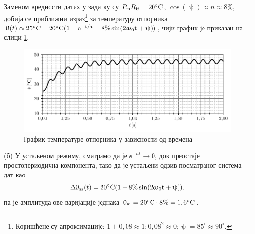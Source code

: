 Заменом вредности датих у задатку су 
${P_{\rm m} R_{\uptheta}} = 20^\circ\rm C$,
$\cos(\uppsi) \approx n \approx 8\%$, добија се приближни израз\footnote{
    Коришћене су апроксимације: $1 + 0,08\approx 1; 0,08^2 \approx 0; \uppsi = 85^\circ \approx 90^\circ$.
}
за температуру отпорника 
$
    \uptheta(t) \approx 25^\circ{\rm C} + 
    20^\circ\rm C( 1 - {\rm e}^{-t/\uptau} - 8\% \sin(2\upomega_0 t + \uppsi) )
$, чији график је приказан на слици \ref{fig:\ID.}.

\begin{figure}[!ht]
\centering
\includegraphics{fig/temperatura.pdf}
\caption{График температуре отпорника у зависности од времена}
\label{fig:\ID.}
\end{figure}

(б) У устаљеном режиму, сматрамо да је $\ee^{-at} \to 0$, док преостаје простопериодична компонента, тако да је 
устаљени одзив посматраног система дат као 
\begin{equation}
    \Delta\uptheta_{\rm ss}(t) =  20^\circ\rm C( 1 - 8\% \sin(2\upomega_0 t + \uppsi) ).
\end{equation}
па је амплитуда ове варијације једнака $\uptheta_{\rm m} = 20^\circ\rm C \cdot 8\% = 1,6^\circ\rm C$. 

